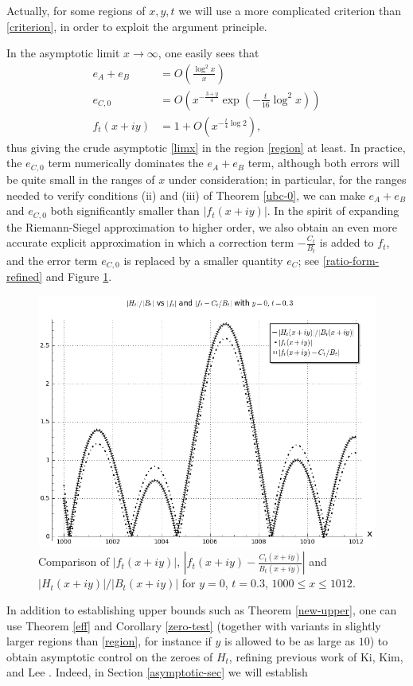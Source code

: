 Actually, for some regions of $x,y,t$ we will use a more complicated criterion than \eqref{criterion}, in order to exploit the argument principle.

In the asymptotic limit $x \to \infty$, one easily sees that 
\begin{align*}
e_A+e_B &= O\left( \frac{\log^2 x}{x} \right)\\
e_{C,0} &= O\left( x^{-\frac{3+y}{4}} \exp\left(-\frac{t}{16} \log^2 x \right) \right)\\
f_t(x+iy) &= 1 + O\left( x^{-\frac{t}{4}\log 2} \right),
\end{align*}
thus giving the crude asymptotic \eqref{limx} in the region \eqref{region} at least.   In practice, the $e_{C,0}$ term numerically dominates the $e_A+e_B$ term, although both errors will be quite small in the ranges of $x$ under consideration; in particular, for the ranges needed to verify conditions (ii) and (iii) of Theorem \ref{ubc-0}, we can make $e_A+e_B$ and $e_{C,0}$ both significantly smaller than $|f_t(x+iy)|$.  In the spirit of expanding the Riemann-Siegel approximation to higher order, we also obtain an even more accurate explicit approximation in which a correction term $-\frac{C_t}{B_t}$ is added to $f_t$, and the error term $e_{C,0}$ is replaced by a smaller quantity $e_C$; see \eqref{ratio-form-refined} and Figure \ref{htft-c}.

\begin{figure}[h!]
  \includegraphics[width=0.6\linewidth]{Extra_RS_term.png}
  \caption{Comparison of $|f_t(x+iy)|$, $|f_t(x+iy)-\frac{C_t(x+iy)}{B_t(x+iy)}|$ and $|H_t(x+iy)|/|B_t(x+iy)|$ for $y=0$, $t=0.3$, $1000 \leq x \leq 1012$.}
	\label{htft-c}
\end{figure}

In addition to establishing upper bounds such as Theorem \ref{new-upper}, one can use Theorem \ref{eff} and Corollary \ref{zero-test} (together with variants in slightly larger regions than \eqref{region}, for instance if $y$ is allowed to be as large as $10$) to obtain asymptotic control on the zeroes of $H_t$, refining previous work of Ki, Kim, and Lee \cite{kkl}.  Indeed, in Section \ref{asymptotic-sec} we will establish

